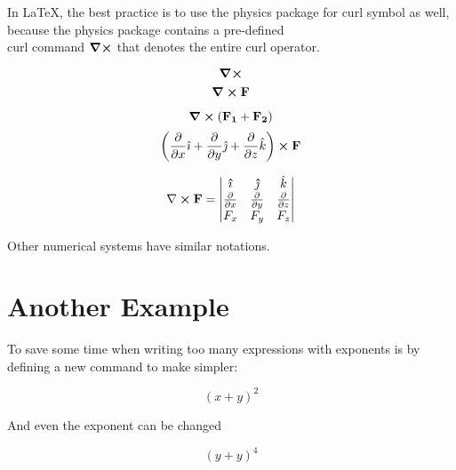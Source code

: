 \documentclass{article}
\begin{document}
In \LaTeX, the best practice is to use the physics package for curl symbol as well, because the physics package contains a pre-defined \\curl command  $\curl$  that denotes the entire curl operator.
	
	
	$$ \curl $$
	$$ \curl{\vb{F}} $$
	
	$$ \curl(\vb{F_{1}}+\vb{F_{2}}) $$
	$$ \qty(\pdv{x}\hat{\imath}+\pdv{y}\hat{\jmath}+\pdv{z}\hat{k})\cp \vb{F} $$

\[
\nabla \cp \vb{F}= \begin{vmatrix}
\vu{\imath} & \vu{\jmath} & \hat{k} \\ 
\pdv{x} & \pdv{y} & \pdv{z} \\ 
F_{x} & F_{y} & F_{z}
\end{vmatrix}
\]

\newcommand{\rx}{\mathbb{R}}



\newcommand{\bb}[1]{\mathbb{#1}}


Other numerical systems have similar notations.
 

\section{Another Example}

\newcommand{\plusbinomial}[3][2]{(#2 + #3)^#1}

To save some time when writing too many expressions 
with exponents is by defining a new command to make simpler:

\[ \plusbinomial{x}{y} \]

And even the exponent can be changed

\[ \plusbinomial[4]{y}{y} \]
\end{document}

